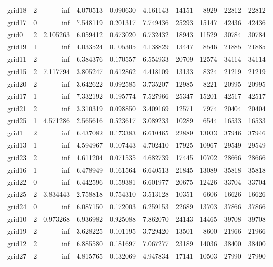 \begin{longtable}{|l|r|r|r|r|r|r|r|r|r|}
grid18 & 2 & inf & 4.070513 & 0.090630 & 4.161143 & 14151 & 8929 & 22812 & 22812 \\
grid17 & 0 & inf & 7.548119 & 0.201317 & 7.749436 & 25293 & 15147 & 42436 & 42436 \\
grid0 & 2 & 2.105263 & 6.059412 & 0.673020 & 6.732432 & 18943 & 11529 & 30784 & 30784 \\
grid19 & 1 & inf & 4.033524 & 0.105305 & 4.138829 & 13447 & 8546 & 21885 & 21885 \\
grid11 & 2 & inf & 6.384376 & 0.170557 & 6.554933 & 20709 & 12574 & 34114 & 34114 \\
grid15 & 2 & 7.117794 & 3.805247 & 0.612862 & 4.418109 & 13133 & 8324 & 21219 & 21219 \\
grid20 & 2 & inf & 3.642622 & 0.092585 & 3.735207 & 12985 & 8221 & 20995 & 20995 \\
grid17 & 1 & inf & 7.332192 & 0.195774 & 7.527966 & 25347 & 15201 & 42517 & 42517 \\
grid21 & 2 & inf & 3.310319 & 0.098850 & 3.409169 & 12571 & 7974 & 20404 & 20404 \\
grid25 & 1 & 4.571286 & 2.565616 & 0.523617 & 3.089233 & 10289 & 6544 & 16533 & 16533 \\
grid1 & 2 & inf & 6.437082 & 0.173383 & 6.610465 & 22889 & 13933 & 37946 & 37946 \\
grid13 & 1 & inf & 4.594967 & 0.107443 & 4.702410 & 17925 & 10967 & 29549 & 29549 \\
grid23 & 2 & inf & 4.611204 & 0.071535 & 4.682739 & 17445 & 10702 & 28666 & 28666 \\
grid16 & 1 & inf & 6.478949 & 0.161564 & 6.640513 & 21845 & 13089 & 35818 & 35818 \\
grid22 & 0 & inf & 6.442596 & 0.159381 & 6.601977 & 20675 & 12426 & 33704 & 33704 \\
grid25 & 2 & 3.834443 & 2.758818 & 0.754310 & 3.513128 & 10351 & 6606 & 16626 & 16626 \\
grid24 & 0 & inf & 6.087150 & 0.172003 & 6.259153 & 22689 & 13703 & 37866 & 37866 \\
grid10 & 2 & 0.973268 & 6.936982 & 0.925088 & 7.862070 & 24143 & 14465 & 39708 & 39708 \\
grid19 & 2 & inf & 3.628225 & 0.101195 & 3.729420 & 13501 & 8600 & 21966 & 21966 \\
grid12 & 2 & inf & 6.885580 & 0.181697 & 7.067277 & 23189 & 14036 & 38400 & 38400 \\
grid27 & 2 & inf & 4.815765 & 0.132069 & 4.947834 & 17141 & 10503 & 27990 & 27990 \\

\end{longtable}
